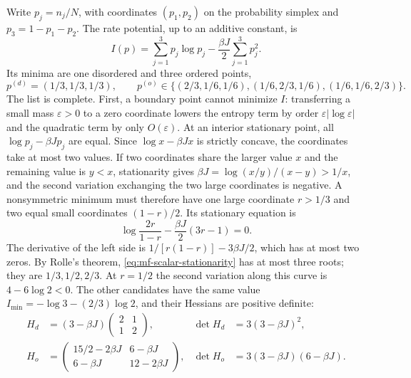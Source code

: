 Write $p_j=n_j/N$, with coordinates $(p_1,p_2)$ on the probability
simplex and $p_3=1-p_1-p_2$. The rate potential, up to an additive
constant, is
\begin{equation}
 I(p)=\sum_{j=1}^3p_j\log p_j-\frac{\beta J}2\sum_{j=1}^3p_j^2.
 \label{eq:mf-rate}
\end{equation}
Its minima are one disordered and three ordered points,
\begin{equation}
 p^{(d)}=(1/3,1/3,1/3),\qquad
 p^{(o)}\in\{(2/3,1/6,1/6),(1/6,2/3,1/6),(1/6,1/6,2/3)\}.
 \label{eq:mf-minima}
\end{equation}
The list is complete. First, a boundary point cannot minimize $I$:
transferring a small mass $\varepsilon>0$ to a zero coordinate lowers
the entropy term by order $\varepsilon|\log\varepsilon|$ and the
quadratic term by only
$O(\varepsilon)$. At an interior stationary point, all $\log p_j-\beta Jp_j$
are equal. Since $\log x-\beta Jx$ is strictly concave, the coordinates take
at most two values. If two coordinates share the larger value $x$ and
the remaining value is $y<x$, stationarity gives
$\beta J=\log(x/y)/(x-y)>1/x$, and the second variation exchanging the two
large coordinates is negative. A nonsymmetric minimum must therefore
have one large coordinate $r>1/3$ and two equal small coordinates
$(1-r)/2$. Its stationary equation is
\begin{equation}
 \log\frac{2r}{1-r}-\frac{\beta J}2(3r-1)=0.
 \label{eq:mf-scalar-stationarity}
\end{equation}
The derivative of the left side is $1/[r(1-r)]-3\beta J/2$, which has at most
two zeros. By Rolle's theorem, \eqref{eq:mf-scalar-stationarity} has
at most three roots; they are $1/3,1/2,2/3$.
At $r=1/2$ the second variation along this curve is
$4-6\log2<0$. The other candidates have the same value
$I_{\min}=-\log3-(2/3)\log2$, and their Hessians are positive definite:
\begin{align}
 H_d&=(3-\beta J)\begin{pmatrix}2&1\\1&2\end{pmatrix},
 &\det H_d&=3(3-\beta J)^2,
 \label{eq:mf-hessian-d}\\
 H_o&=\begin{pmatrix}15/2-2\beta J&6-\beta J\\6-\beta J&12-2\beta J\end{pmatrix},
 &\det H_o&=3(3-\beta J)(6-\beta J).
 \label{eq:mf-hessian-o}
\end{align}

